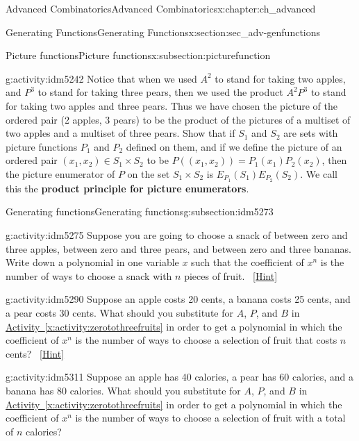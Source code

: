 \documentclass[oneside,10pt,]{book}
\newcommand{\terminology}[1]{\textbf{#1}}
\numberwithin{equation}{chapter}
\begin{document}
\begin{chapterptx}{Advanced Combinatorics}{}{Advanced Combinatorics}{}{}{x:chapter:ch_advanced}
\begin{sectionptx}{Generating Functions}{}{Generating Functions}{}{}{x:section:sec_adv-genfunctions}
\begin{subsectionptx}{Picture functions}{}{Picture functions}{}{}{x:subsection:picturefunction}
\begin{activity}{}{g:activity:idm5242}%
Notice that when we used \(A^2\) to stand for taking two apples, and \(P^3\) to stand for taking three pears, then we used the product \(A^2P^3\) to stand for taking two apples and three pears. Thus we have chosen the picture of the ordered pair (2 apples, 3 pears) to be the product of the pictures of a multiset of two apples and a multiset of three pears. Show that if \(S_1\) and \(S_2\) are sets with picture functions \(P_1\) and \(P_2\) defined on them, and if we define the picture of an ordered pair \((x_1,x_2)\in S_1\times S_2\) to be \(P((x_1,x_2))= P_1(x_1)P_2(x_2)\), then the picture enumerator of \(P\) on the set \(S_1\times S_2\) is \(E_{P_1}(S_1)E_{P_2}(S_2)\). We call this the \terminology{product principle for picture enumerators}.%
\end{activity}
\end{subsectionptx}
%
%
\typeout{************************************************}
\typeout{************************************************}
%
\begin{subsectionptx}{Generating functions}{}{Generating functions}{}{}{g:subsection:idm5273}
\begin{activity}{}{g:activity:idm5275}%
Suppose you are going to choose a snack of between zero and three apples, between zero and three pears, and between zero and three bananas. Write down a polynomial in one variable \(x\) such that the coefficient of \(x^n\) is the number of ways to choose a snack with \(n\) pieces of fruit.%
\qquad~\hfill{\tiny\hyperlink{g:hint:idm5281-back}{[Hint]}}\end{activity}
\begin{activity}{}{g:activity:idm5290}%
Suppose an apple costs 20 cents, a banana costs 25 cents, and a pear costs 30 cents. What should you substitute for \(A\), \(P\), and \(B\) in \hyperref[x:activity:zerotothreefruits]{Activity~\ref{x:activity:zerotothreefruits}} in order to get a polynomial in which the coefficient of \(x^n\) is the number of ways to choose a selection of fruit that costs \(n\) cents?%
\qquad~\hfill{\tiny\hyperlink{g:hint:idm5299-back}{[Hint]}}\end{activity}
\begin{activity}{}{g:activity:idm5311}%
Suppose an apple has 40 calories, a pear has 60 calories, and a banana has 80 calories. What should you substitute for \(A\), \(P\), and \(B\) in \hyperref[x:activity:zerotothreefruits]{Activity~\ref{x:activity:zerotothreefruits}} in order to get a polynomial in which the coefficient of \(x^n\) is the number of ways to choose a selection of fruit with a total of \(n\) calories?%

\end{activity}
\end{subsectionptx}
\end{sectionptx}
\end{chapterptx}
\end{document}
